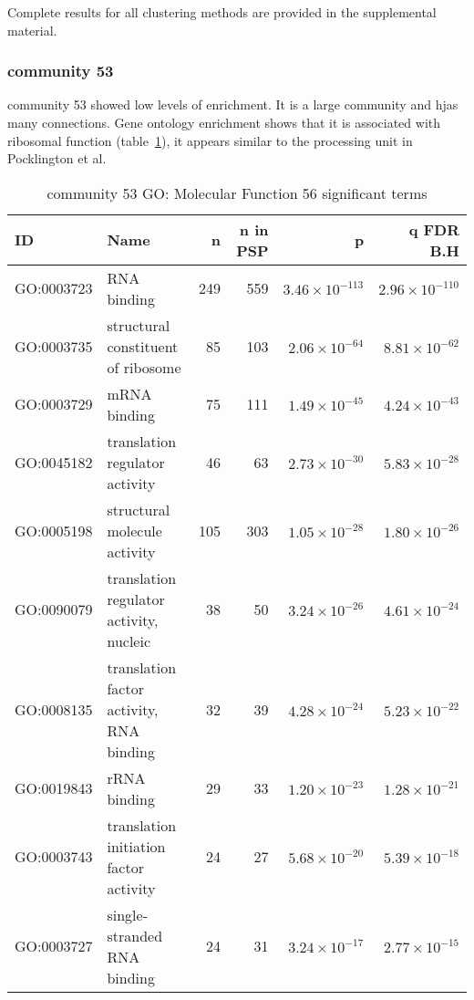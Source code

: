 Complete results for all clustering methods are provided in the supplemental material. 



\subsubsection{community 53}

community 53 showed low levels of enrichment. It is a large community and hjas many connections. Gene ontology enrichment shows that it is associated with ribosomal function (table~\ref{tab:Group 53 GO: Molecular Function 56 significant terms}), it appears similar to the processing unit in Pocklington et al\cite{pocklington2006organization}.

\begin{table}[ht]
\centering
\begin{tabular}{llrrrr}
  \toprule
ID & Name & n & n in PSP & p & q FDR B.H \\ 
  \midrule
GO:0003723 & RNA binding & 249 & 559 & $3.46 \times 10^{-113}$ & $2.96 \times 10^{-110}$ \\ 
  GO:0003735 & structural constituent of ribosome & 85 & 103 & $2.06 \times 10^{-64}$ & $8.81 \times 10^{-62}$ \\ 
  GO:0003729 & mRNA binding & 75 & 111 & $1.49 \times 10^{-45}$ & $4.24 \times 10^{-43}$ \\ 
  GO:0045182 & translation regulator activity & 46 & 63 & $2.73 \times 10^{-30}$ & $5.83 \times 10^{-28}$ \\ 
  GO:0005198 & structural molecule activity & 105 & 303 & $1.05 \times 10^{-28}$ & $1.80 \times 10^{-26}$ \\ 
  GO:0090079 & translation regulator activity, nucleic  & 38 & 50 & $3.24 \times 10^{-26}$ & $4.61 \times 10^{-24}$ \\ 
  GO:0008135 & translation factor activity, RNA binding & 32 & 39 & $4.28 \times 10^{-24}$ & $5.23 \times 10^{-22}$ \\ 
  GO:0019843 & rRNA binding & 29 & 33 & $1.20 \times 10^{-23}$ & $1.28 \times 10^{-21}$ \\ 
  GO:0003743 & translation initiation factor activity & 24 & 27 & $5.68 \times 10^{-20}$ & $5.39 \times 10^{-18}$ \\ 
  GO:0003727 & single-stranded RNA binding & 24 & 31 & $3.24 \times 10^{-17}$ & $2.77 \times 10^{-15}$ \\ 
   \bottomrule
\end{tabular}
\caption{community 53 GO: Molecular Function 56 significant terms} 
\label{tab:Group 53 GO: Molecular Function 56 significant terms}
\end{table}



